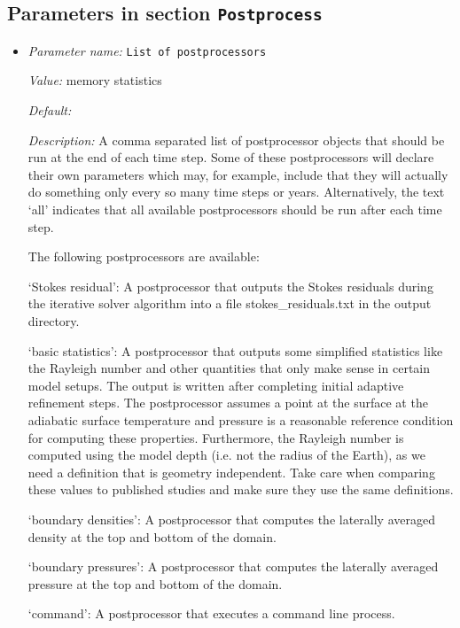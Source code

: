 \subsection{Parameters in section \tt Postprocess}
\label{parameters:Postprocess}

\begin{itemize}
\item {\it Parameter name:} {\tt List of postprocessors}
\label{parameters:Postprocess/List of postprocessors}
\label{parameters:Postprocess/List_20of_20postprocessors}


{\it Value:} memory statistics


{\it Default:} 


{\it Description:} A comma separated list of postprocessor objects that should be run at the end of each time step. Some of these postprocessors will declare their own parameters which may, for example, include that they will actually do something only every so many time steps or years. Alternatively, the text `all' indicates that all available postprocessors should be run after each time step.

The following postprocessors are available:

`Stokes residual': A postprocessor that outputs the Stokes residuals during the iterative solver algorithm into a file stokes_residuals.txt in the output directory.

`basic statistics': A postprocessor that outputs some simplified statistics like the Rayleigh number and other quantities that only make sense in certain model setups. The output is written after completing initial adaptive refinement steps. The postprocessor assumes a point at the surface at the adiabatic surface temperature and pressure is a reasonable reference condition for computing these properties. Furthermore, the Rayleigh number is computed using the model depth (i.e. not the radius of the Earth), as we need a definition that is geometry independent. Take care when comparing these values to published studies and make sure they use the same definitions.

`boundary densities': A postprocessor that computes the laterally averaged density at the top and bottom of the domain.

`boundary pressures': A postprocessor that computes the laterally averaged pressure at the top and bottom of the domain.

`command': A postprocessor that executes a command line process.


\end{itemize}

